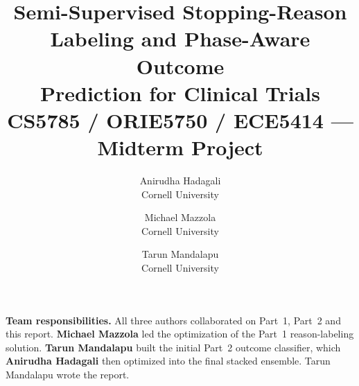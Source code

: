 \documentclass[10pt,twocolumn,letterpaper]{article}
\title{Semi-Supervised Stopping-Reason Labeling and Phase-Aware Outcome\\
Prediction for Clinical Trials\\
\vspace{0.35em}
\large CS5785 / ORIE5750 / ECE5414 --- Midterm Project}
\author{Anirudha Hadagali\\
Cornell University
\and
Michael Mazzola\\
Cornell University
\and
Tarun Mandalapu\\
Cornell University
}
\begin{document}
\maketitle



\noindent\textbf{Team responsibilities.}
All three authors collaborated on Part~1, Part~2 and this report.
\textbf{Michael Mazzola} led the optimization of the Part~1 reason-labeling
solution. \textbf{Tarun Mandalapu} built the initial Part~2 outcome classifier,
which \textbf{Anirudha Hadagali} then optimized into the final stacked ensemble.
Tarun Mandalapu wrote the report.





{
    \small
    
    
}
\end{document}
